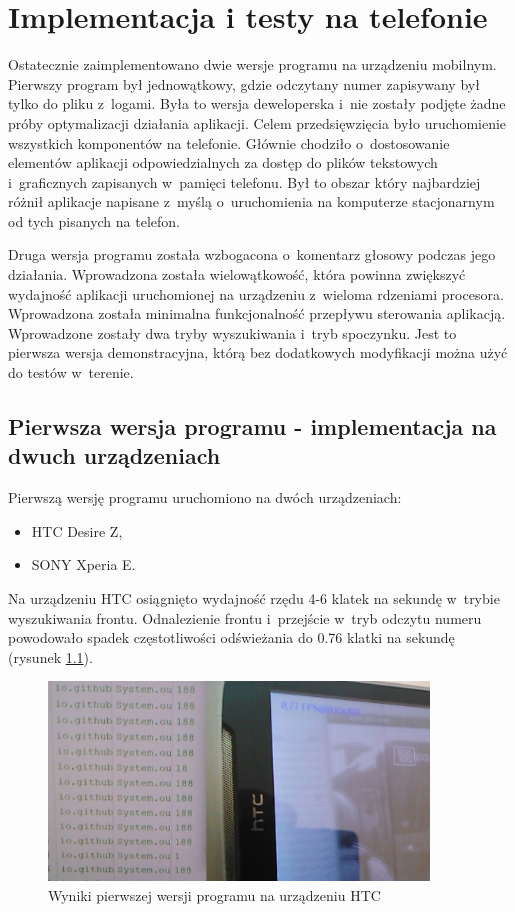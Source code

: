 \chapter{Implementacja i testy na telefonie}

Ostatecznie zaimplementowano dwie wersje programu na urządzeniu mobilnym.
Pierwszy program był jednowątkowy, gdzie odczytany numer zapisywany
był tylko do pliku z~logami. Była
to wersja deweloperska i~nie zostały podjęte żadne próby optymalizacji
działania aplikacji. Celem przedsięwzięcia
było uruchomienie wszystkich komponentów na telefonie. Głównie
chodziło o~dostosowanie elementów aplikacji odpowiedzialnych za
dostęp do plików tekstowych i~graficznych zapisanych w~pamięci telefonu.
Był to obszar który najbardziej różnił aplikacje napisane z~myślą
o~uruchomienia na komputerze stacjonarnym od tych pisanych na telefon.

Druga wersja programu została wzbogacona o~komentarz głosowy
podczas jego działania. Wprowadzona została wielowątkowość, 
która powinna zwiększyć wydajność aplikacji uruchomionej na 
urządzeniu z~wieloma rdzeniami procesora.
Wprowadzona została minimalna funkcjonalność przepływu
sterowania aplikacją. Wprowadzone zostały dwa tryby wyszukiwania
i~tryb spoczynku. Jest to pierwsza wersja demonstracyjna, którą
bez dodatkowych modyfikacji można użyć do testów w~terenie.

\section{Pierwsza wersja programu - implementacja na dwuch urządzeniach}

Pierwszą wersję programu uruchomiono na dwóch urządzeniach:

\begin{itemize}
    \item HTC Desire Z,
    \item SONY Xperia E.
\end{itemize}

Na urządzeniu HTC osiągnięto wydajność rzędu 4-6 klatek na sekundę
w~trybie wyszukiwania frontu. Odnalezienie frontu i~przejście 
w~tryb odczytu numeru powodowało spadek częstotliwości odświeżania
do 0.76 klatki na sekundę (rysunek \ref{fig:imp_htc_v1}).

\begin{figure}[h!]
    \centering
    \includegraphics[width=0.9\textwidth]{img/imp_htc_v1}
    \caption{Wyniki pierwszej wersji programu na urządzeniu HTC}
    \label{fig:imp_htc_v1}
\end{figure}

